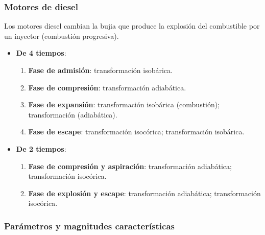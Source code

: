 \documentclass[10pt]{article}
\begin{document}
\subsubsection{Motores de diesel}

Los motores diesel cambian la bujia que produce la explosión del combustible por un inyector (combustión progresiva).

\begin{itemize}
    \item \textbf{De 4 tiempos}:
        \begin{enumerate}
            \item \textbf{Fase de admisión}: transformación isobárica.
            \item \textbf{Fase de compresión}: transformación adiabática.
            \item \textbf{Fase de expansión}: transformación isobárica (combustión); transformación (adiabática).
            \item \textbf{Fase de escape}: transformación isocórica; transformación isobárica.
        \end{enumerate}
        \begin{center}
        \end{center}
    \item \textbf{De 2 tiempos}:
        \begin{enumerate}
            \item \textbf{Fase de compresión y aspiración}: transformación adiabática; transformación isocórica.
            \item \textbf{Fase de explosión y escape}: transformación adiabática; transformación isocórica.
        \end{enumerate}
        \begin{center}
        \end{center}
\end{itemize}

\subsubsection{Parámetros y magnitudes características}
\end{document}
